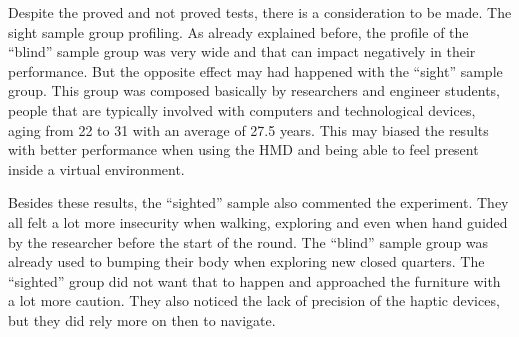 Despite the proved and not proved tests, there is a consideration to be made. The sight sample group profiling. As already explained before, the profile of the “blind” sample group was very wide and that can impact negatively in their performance. But the opposite effect may had happened with the “sight” sample group. This group was composed basically by researchers and engineer students, people that are typically involved with computers and technological devices, aging from 22 to 31 with an average of 27.5 years. This may biased the results with better performance when using the HMD and being able to feel present inside a virtual environment.

Besides these results, the “sighted” sample also commented the experiment. They all felt a lot more insecurity when walking, exploring and even when hand guided by the researcher before the start of the round. The “blind” sample group was already used to bumping their body when exploring new closed quarters. The “sighted” group did not want that to happen and approached the furniture with a lot more caution. They also noticed the lack of precision of the haptic devices, but they did rely more on then to navigate.

